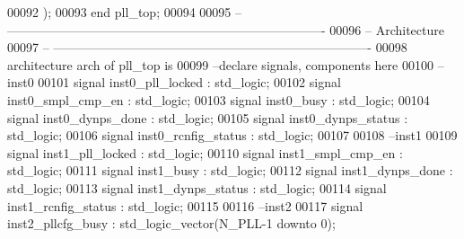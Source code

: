 \begin{DoxyCode}
00092       \textcolor{vhdlchar}{)};
00093 \textcolor{keywordflow}{end} \textcolor{vhdlchar}{pll\_top};
00094 
00095 \textcolor{keyword}{-- ----------------------------------------------------------------------------}
00096 \textcolor{keyword}{-- Architecture}
00097 \textcolor{keyword}{-- ----------------------------------------------------------------------------}
00098 \textcolor{keywordflow}{architecture} arch \textcolor{keywordflow}{of} pll_top is
00099 \textcolor{keyword}{--declare signals,  components here}
00100 \textcolor{keyword}{--inst0}
00101 \textcolor{keywordflow}{signal} \textcolor{vhdlchar}{inst0_pll_locked}    \textcolor{vhdlchar}{:} \textcolor{comment}{std\_logic};
00102 \textcolor{keywordflow}{signal} \textcolor{vhdlchar}{inst0_smpl_cmp_en}   \textcolor{vhdlchar}{:} \textcolor{comment}{std\_logic};
00103 \textcolor{keywordflow}{signal} \textcolor{vhdlchar}{inst0_busy}          \textcolor{vhdlchar}{:} \textcolor{comment}{std\_logic};
00104 \textcolor{keywordflow}{signal} \textcolor{vhdlchar}{inst0_dynps_done}    \textcolor{vhdlchar}{:} \textcolor{comment}{std\_logic};
00105 \textcolor{keywordflow}{signal} \textcolor{vhdlchar}{inst0_dynps_status}  \textcolor{vhdlchar}{:} \textcolor{comment}{std\_logic};
00106 \textcolor{keywordflow}{signal} \textcolor{vhdlchar}{inst0_rcnfig_status} \textcolor{vhdlchar}{:} \textcolor{comment}{std\_logic};
00107 
00108 \textcolor{keyword}{--inst1}
00109 \textcolor{keywordflow}{signal} \textcolor{vhdlchar}{inst1_pll_locked}    \textcolor{vhdlchar}{:} \textcolor{comment}{std\_logic};
00110 \textcolor{keywordflow}{signal} \textcolor{vhdlchar}{inst1_smpl_cmp_en}   \textcolor{vhdlchar}{:} \textcolor{comment}{std\_logic};
00111 \textcolor{keywordflow}{signal} \textcolor{vhdlchar}{inst1_busy}          \textcolor{vhdlchar}{:} \textcolor{comment}{std\_logic};
00112 \textcolor{keywordflow}{signal} \textcolor{vhdlchar}{inst1_dynps_done}    \textcolor{vhdlchar}{:} \textcolor{comment}{std\_logic};
00113 \textcolor{keywordflow}{signal} \textcolor{vhdlchar}{inst1_dynps_status}  \textcolor{vhdlchar}{:} \textcolor{comment}{std\_logic};
00114 \textcolor{keywordflow}{signal} \textcolor{vhdlchar}{inst1_rcnfig_status} \textcolor{vhdlchar}{:} \textcolor{comment}{std\_logic};
00115 
00116 \textcolor{keyword}{--inst2}
00117 \textcolor{keywordflow}{signal} \textcolor{vhdlchar}{inst2_pllcfg_busy}      \textcolor{vhdlchar}{:} \textcolor{comment}{std\_logic\_vector}\textcolor{vhdlchar}{(}\textcolor{vhdlchar}{N_PLL}\textcolor{vhdlchar}{-}\textcolor{vhdllogic}{}\textcolor{vhdllogic}{1} \textcolor{keywordflow}{downto} \textcolor{vhdllogic}{}\textcolor{vhdllogic}{0}\textcolor{vhdlchar}{)};

\end{DoxyCode}
